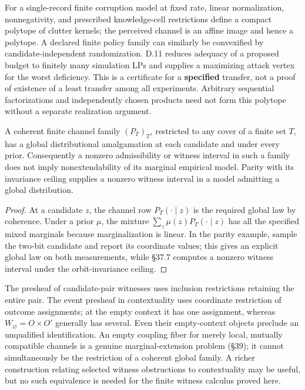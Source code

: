 For a single-record finite corruption model at fixed rate, linear normalization, nonnegativity, and prescribed knowledge-cell restrictions define a compact polytope of clutter kernels; the perceived channel is an affine image and hence a polytope. A declared finite policy family can similarly be convexified by candidate-independent randomization. D.11 reduces adequacy of a proposed budget to finitely many simulation LPs and supplies a maximizing attack vertex for the worst deficiency. This is a certificate for a \textbf{specified} transfer, not a proof of existence of a least transfer among all experiments. Arbitrary sequential factorizations and independently chosen products need not form this polytope without a separate realization argument.


\begin{thmplain}

A coherent finite channel family \((P_T)_T\), restricted to any cover of a finite set \(T\), has a global distributional amalgamation at each candidate and under every prior. Consequently a nonzero admissibility or witness interval in such a family does not imply nonextendability of its marginal empirical model. Parity with its invariance ceiling supplies a nonzero witness interval in a model admitting a global distribution.
\end{thmplain}

\begin{proof}

At a candidate \(z\), the channel row \(P_T(\cdot\mid z)\) is the required global law by coherence. Under a prior \(\mu\), the mixture \(\sum_z\mu(z)P_T(\cdot\mid z)\) has all the specified mixed marginals because marginalization is linear. In the parity example, sample the two-bit candidate and report its coordinate values; this gives an explicit global law on both measurements, while §37.7 computes a nonzero witness interval under the orbit-invariance ceiling.
\end{proof}

The presheaf of candidate-pair witnesses uses inclusion restrictions retaining the entire pair. The event presheaf in contextuality uses coordinate restriction of outcome assignments; at the empty context it has one assignment, whereas \(W_\varnothing=O\times O'\) generally has several. Even their empty-context objects preclude an unqualified identification. An empty coupling fiber for merely local, mutually compatible channels is a genuine marginal-extension problem (§39); it cannot simultaneously be the restriction of a coherent global family. A richer construction relating selected witness obstructions to contextuality may be useful, but no such equivalence is needed for the finite witness calculus proved here.

